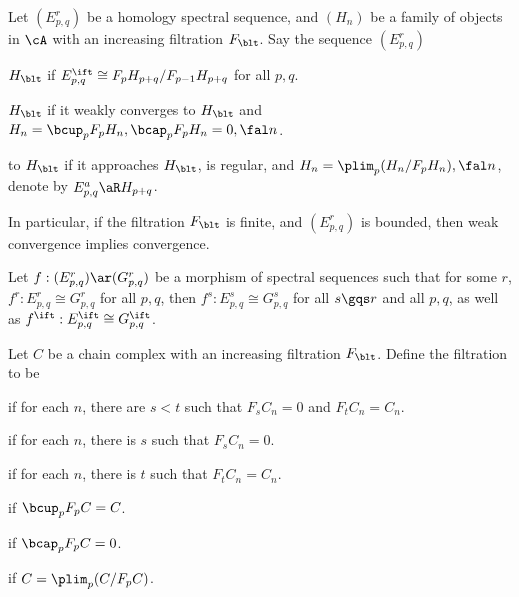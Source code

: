 \documentclass[a4paper, twoside]{article}
\begin{document}
\begin{dfn}[5.2.5, 5.2.11]
    Let $(E_{p,q}^{r})$ be a homology spectral sequence, and $(H_{n})$ be a family of objects in $\cA$ with an increasing filtration $F_{\blt}$. Say the sequence $(E_{p,q}^{r})$
    \begin{itm}
        \item {} $H_{\blt}$ if $E_{p,q}^{\ift}\cong F_{p}H_{p+q}/F_{p-1}H_{p+q}$ for all $p,q$.
        \item {} $H_{\blt}$ if it weakly converges to $H_{\blt}$ and $H_{n}=\bcup_{p} F_{p}H_{n},\bcap_{p}F_{p}H_{n}=0,\fal n$.
        \item {} to $H_{\blt}$ if it approaches $H_{\blt}$, is regular, and $H_{n}=\plim_{p}(H_{n}/F_{p}H_{n}),\fal n$, denote by $E_{p,q}^{a}\aR H_{p+q}$.
    \end{itm}

    In particular, if the filtration $F_{\blt}$ is finite, and $(E_{p,q}^{r})$ is bounded, then weak convergence implies convergence.
\end{dfn}

\begin{thm}
    Let $f:(E_{p,q}^{r})\ar(G_{p,q}^{r})$ be a morphism of spectral sequences such that for some $r$, $f^{r}:E_{p,q}^{r}\cong G_{p,q}^{r}$ for all $p,q$, then $f^{s}:E_{p,q}^{s}\cong G_{p,q}^{s}$ for all $s\gqs r$ and all $p,q$, as well as $f^{\ift}:E_{p,q}^{\ift}\cong G_{p,q}^{\ift}$.
\end{thm}

\begin{dfn}
    Let $C$ be a chain complex with an increasing filtration $F_{\blt}$. Define the filtration to be
    \begin{itm}
        \item {} if for each $n$, there are $s<t$ such that $F_{s}C_{n}=0$ and $F_{t}C_{n}=C_{n}$.
        \item {} if for each $n$, there is $s$ such that $F_{s}C_{n}=0$.
        \item {} if for each $n$, there is $t$ such that $F_{t}C_{n}=C_{n}$.
        \item {} if $\bcup_{p}F_{p}C=C$.
        \item {} if $\bcap_{p}F_{p}C=0$.
        \item {} if $C=\plim_{p}(C/F_{p}C)$.
    \end{itm}
\end{dfn}
\end{document}
